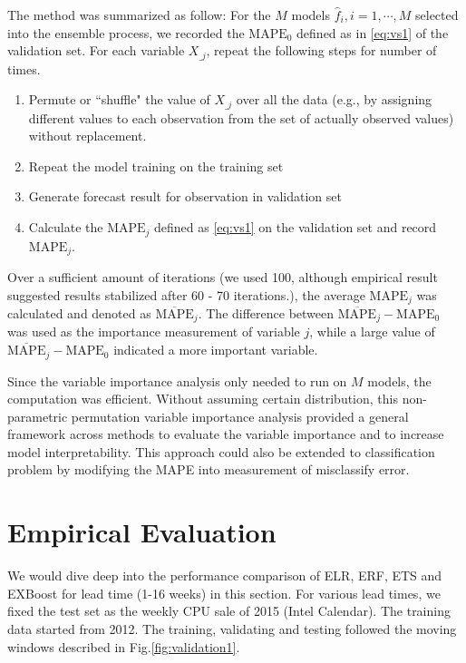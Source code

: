 \documentclass{llncs}
\begin{document}
The method was summarized as follow: For the $M$ models $\hat{f}_i, i = 1, \cdots, M$ selected into the ensemble process, we recorded the $\mathrm{MAPE}_0$ defined as in \ref{eq:vs1} of the validation set. 
For each variable $X_{\_j}$, repeat the following steps for number of times.
\begin{enumerate}
\item Permute or ``shuffle" the value of $X_{\_j}$ over all the data (e.g., by assigning different values to each observation from the set of actually observed values) without replacement. 
\item Repeat the model training on the training set
\item Generate forecast result for observation in validation set
\item Calculate the $\mathrm{MAPE}_j$ defined as \ref{eq:vs1} on the validation set and record $\mathrm{MAPE}_j$.
\end{enumerate}

Over a sufficient amount of iterations (we used 100, although empirical result suggested results stabilized after 60 - 70 iterations.), the average $\mathrm{MAPE}_j$ was calculated and denoted as $\overline{\mathrm{MAPE}}_j$. The difference between $\overline{\mathrm{MAPE}}_j - \mathrm{MAPE}_0$ was used as the importance measurement of variable $j$,  while a large value of  $\overline{\mathrm{MAPE}}_j - \mathrm{MAPE}_0$ indicated a more important variable.

Since the variable importance analysis only needed to run on $M$ models, the computation was efficient. Without assuming certain distribution, this non-parametric permutation variable importance analysis provided a general framework across methods to evaluate the variable importance and to increase model interpretability. This approach could also be extended to classification problem by modifying the MAPE into measurement of misclassify error.



\section{Empirical Evaluation}
\label{sec:result}
We would dive deep into the performance comparison of ELR, ERF, ETS and EXBoost for lead time (1-16 weeks) in this section. For various lead times, we fixed the test set as the weekly CPU sale of 2015 (Intel Calendar). The training data started from 2012. The training, validating and testing followed the moving windows described in Fig.\ref{fig:validation1}.
\end{document}
